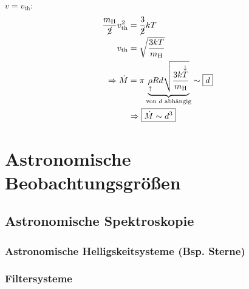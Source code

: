 $v = v_{\mathrm{th}}$:
\begin{align*}
    \frac{m_{\mathrm{H}}}{\cancel{2}} v_{\mathrm{th}}^2 &= \frac{3}{\cancel{2}} kT \\
    v_{\mathrm{th}} &= \sqrt{\frac{3kT}{m_{\mathrm{H}}}} \\
    \Rightarrow \dot M &= \pi \underbrace{\underset{\uparrow}{\rho} R d \sqrt{\frac{3k\overset{\downarrow}{T}}{m_{\mathrm{H}}}}}_{\text{von $d$ abhängig}} \sim \boxed{d} \\
                       &\Rightarrow \boxed{\dot M \sim d^3}
\end{align*}

\part{Astronomische Beobachtungsgrößen}
\chapter{Astronomische Spektroskopie}
\section[Astronomische Helligskeitsysteme]{Astronomische Helligskeitsysteme (Bsp. Sterne)}
\section{Filtersysteme}

